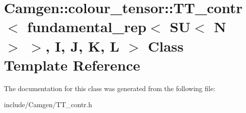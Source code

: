 \hypertarget{a00533}{\section{Camgen\-:\-:colour\-\_\-tensor\-:\-:T\-T\-\_\-contr$<$ fundamental\-\_\-rep$<$ S\-U$<$ N $>$ $>$, I, J, K, L $>$ Class Template Reference}
\label{a00533}
}


The documentation for this class was generated from the following file\-:\begin{DoxyCompactItemize}
\item 
include/\-Camgen/T\-T\-\_\-contr.\-h\end{DoxyCompactItemize}
